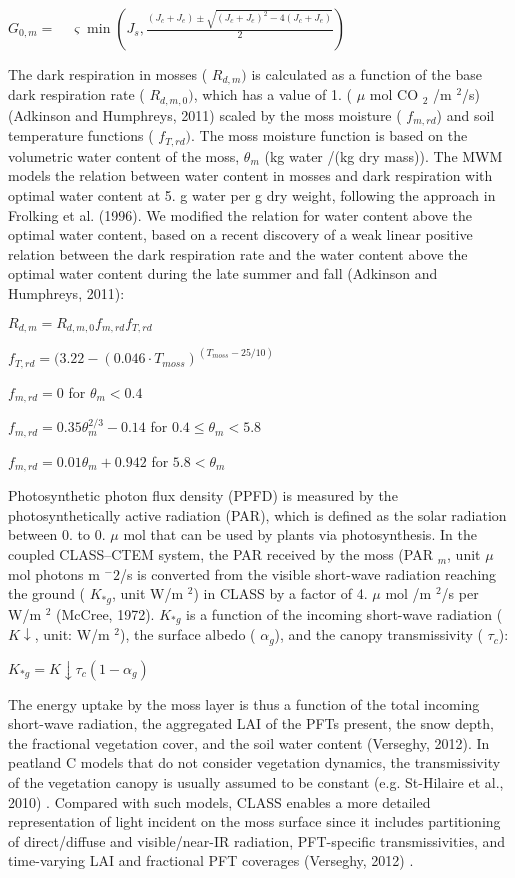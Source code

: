 $ G_{0,m} = \quad \varsigma \min \left(J_{s},\frac{(J_{c}+J_{e})\pm \sqrt{{(J_c +J_ e )}^2 - 4(J_c +J_e)} }{2}\right) $

The dark respiration in mosses ( $R_{d,m})$ is calculated as a function of the base dark respiration rate ( $R_{d,m,0})$, which has a value of 1. ( $\mu $ mol C\+O $_2 $ /m $^2 $/s) (Adkinson and Humphreys, 2011) scaled by the moss moisture ( $f_{m,rd}$) and soil temperature functions ( $f_{T,rd})$. The moss moisture function is based on the volumetric water content of the moss, $\theta_m$ (kg water /(kg dry mass)). The M\+W\+M models the relation between water content in mosses and dark respiration with optimal water content at 5. g water per g dry weight, following the approach in Frolking et al. (1996). We modified the relation for water content above the optimal water content, based on a recent discovery of a weak linear positive relation between the dark respiration rate and the water content above the optimal water content during the late summer and fall (Adkinson and Humphreys, 2011)\+:

$R_{d,m} = R_{d,m,0} f_{m,rd} f_{T,{rd}}$

$ f_{T,{rd}} = (3.22-(0.046 \cdot T_{moss})^{(T_{moss}-25/10)} $

$ f_{m,rd} = 0$ for $ \theta_{m} <0.4 $

$ f_{m,rd} = 0.35 \theta_{m}^{2/3}-0.14$ for $ 0.4\le \theta_m<5.8 $

$ f_{m,rd} = 0.01 \theta_{m} +0.942$ for $5.8<\theta _{m} $

Photosynthetic photon flux density (P\+P\+F\+D) is measured by the photosynthetically active radiation (P\+A\+R), which is defined as the solar radiation between 0. to 0. $\mu $ mol that can be used by plants via photosynthesis. In the coupled C\+L\+A\+S\+S--C\+T\+E\+M system, the P\+A\+R received by the moss (P\+A\+R $_m$, unit $\mu $mol photons m $^-2$/s is converted from the visible short-\/wave radiation reaching the ground ( $K_{\ast g}$, unit W/m $^2$) in C\+L\+A\+S\+S by a factor of 4. $\mu$ mol /m $^2$/s per W/m $^2$ (Mc\+Cree, 1972). $K_{\ast g}$ is a function of the incoming short-\/wave radiation ( $K\downarrow $, unit\+: W/m $^2$), the surface albedo ( $\alpha_g$), and the canopy transmissivity ( $\tau _c$)\+:

$K_{\ast g} = K \downarrow \tau_{c}\left( 1-\alpha_{g}\right)$

The energy uptake by the moss layer is thus a function of the total incoming short-\/wave radiation, the aggregated L\+A\+I of the P\+F\+Ts present, the snow depth, the fractional vegetation cover, and the soil water content (Verseghy, 2012). In peatland C models that do not consider vegetation dynamics, the transmissivity of the vegetation canopy is usually assumed to be constant (e.\+g. St-\/\+Hilaire et al., 2010) \cite{St-Hilaire2010-5e9}. Compared with such models, C\+L\+A\+S\+S enables a more detailed representation of light incident on the moss surface since it includes partitioning of direct/diffuse and visible/near-\/\+I\+R radiation, P\+F\+T-\/specific transmissivities, and time-\/varying L\+A\+I and fractional P\+F\+T coverages (Verseghy, 2012) \cite{Verseghy2012-c0e}. 

